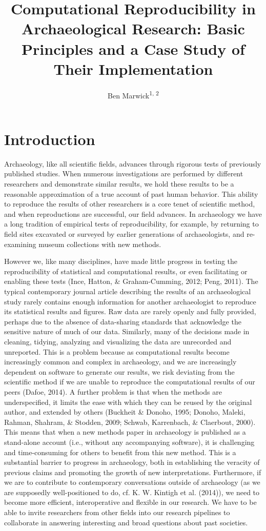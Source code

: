 \documentclass[american,man]{apa6}
\title{Computational Reproducibility in Archaeological Research: Basic
Principles and a Case Study of Their Implementation}
\author{
          Ben Marwick\textsuperscript{1, 2}  }
\affiliation{
    \vspace{0.5cm}
          \textsuperscript{1} Department of Anthropology, University of Washington, Seattle\\
          \textsuperscript{2} Center for Archaeological Science, University of Wollongong, Australia  }
\newcounter{author}
\begin{document}
\maketitle



\section{Introduction}\label{introduction}

Archaeology, like all scientific fields, advances through rigorous tests
of previously published studies. When numerous investigations are
performed by different researchers and demonstrate similar results, we
hold these results to be a reasonable approximation of a true account of
past human behavior. This ability to reproduce the results of other
researchers is a core tenet of scientific method, and when reproductions
are successful, our field advances. In archaeology we have a long
tradition of empirical tests of reproducibility, for example, by
returning to field sites excavated or surveyed by earlier generations of
archaeologists, and re-examining museum collections with new methods.

However we, like many disciplines, have made little progress in testing
the reproducibility of statistical and computational results, or even
facilitating or enabling these tests (Ince, Hatton, \& Graham-Cumming,
2012; Peng, 2011). The typical contemporary journal article describing
the results of an archaeological study rarely contains enough
information for another archaeologist to reproduce its statistical
results and figures. Raw data are rarely openly and fully provided,
perhaps due to the absence of data-sharing standards that acknowledge
the sensitive nature of much of our data. Similarly, many of the
decisions made in cleaning, tidying, analyzing and visualizing the data
are unrecorded and unreported. This is a problem because as
computational results become increasingly common and complex in
archaeology, and we are increasingly dependent on software to generate
our results, we risk deviating from the scientific method if we are
unable to reproduce the computational results of our peers (Dafoe,
2014). A further problem is that when the methods are underspecified, it
limits the ease with which they can be reused by the original author,
and extended by others (Buckheit \& Donoho, 1995; Donoho, Maleki,
Rahman, Shahram, \& Stodden, 2009; Schwab, Karrenbach, \& Claerbout,
2000). This means that when a new methods paper in archaeology is
published as a stand-alone account (i.e., without any accompanying
software), it is challenging and time-consuming for others to benefit
from this new method. This is a substantial barrier to progress in
archaeology, both in establishing the veracity of previous claims and
promoting the growth of new interpretations. Furthermore, if we are to
contribute to contemporary conversations outside of archaeology (as we
are supposedly well-positioned to do, cf. K. W. Kintigh et al. (2014)),
we need to become more efficient, interoperative and flexible in our
research. We have to be able to invite researchers from other fields
into our research pipelines to collaborate in answering interesting and
broad questions about past societies.
\end{document}
